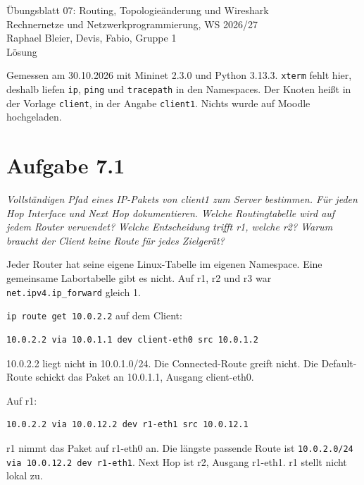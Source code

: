 \documentclass[a4paper,11pt]{article}
\newif\ifexplain
\newcommand{\aufgabe}[1]{\section*{Aufgabe #1}}
\newcommand{\angabe}[1]{{\raggedright\textit{#1}\par}\smallskip}
\newcommand{\explain}[1]{\ifexplain\begin{erklbox}#1\end{erklbox}\fi}
\begin{document}
\begin{center}
{\Large Übungsblatt 07: Routing, Topologieänderung und Wireshark}\\
Rechnernetze und Netzwerkprogrammierung, WS 2026/27\\
Raphael Bleier, Devis, Fabio, Gruppe 1\\
\ifexplain Erklärung\else Lösung\fi
\end{center}
Gemessen am 30.10.2026 mit Mininet 2.3.0 und Python 3.13.3. \texttt{xterm} fehlt hier, deshalb liefen \texttt{ip}, \texttt{ping} und \texttt{tracepath} in den Namespaces. Der Knoten heißt in der Vorlage \texttt{client}, in der Angabe \texttt{client1}. Nichts wurde auf Moodle hochgeladen.

\explain{Die Vorlage setzt Adressen in \texttt{start\_lab.py}, nicht in \texttt{topology.py}. r3 kommt in der Vorlage nicht vor. Die neuen Adressen stehen deshalb in der \texttt{start\_lab.py} dieses Ordners. Die Zahlen unten sind der Lauf vom 30.10.2026, nicht gerundet aus dem Bauch.}

\aufgabe{7.1}
\angabe{Vollständigen Pfad eines IP-Pakets von client1 zum Server bestimmen. Für jeden Hop Interface und Next Hop dokumentieren. Welche Routingtabelle wird auf jedem Router verwendet? Welche Entscheidung trifft r1, welche r2? Warum braucht der Client keine Route für jedes Zielgerät?}

Jeder Router hat seine eigene Linux-Tabelle im eigenen Namespace. Eine gemeinsame Labortabelle gibt es nicht. Auf r1, r2 und r3 war \texttt{net.ipv4.ip\_forward} gleich 1.

\texttt{ip route get 10.0.2.2} auf dem Client:
\begin{lstlisting}
10.0.2.2 via 10.0.1.1 dev client-eth0 src 10.0.1.2
\end{lstlisting}
10.0.2.2 liegt nicht in 10.0.1.0/24. Die Connected-Route greift nicht. Die Default-Route schickt das Paket an 10.0.1.1, Ausgang client-eth0.

\explain{Eine Default-Route ist die Sammelroute für alles, was keine längere passende Route hat. Der Client muss die Serveradresse nicht kennen. Er muss nur wissen, dass sie nicht lokal ist. Deshalb reicht ein Eintrag für alle fremden Ziele.}

Auf r1:
\begin{lstlisting}
10.0.2.2 via 10.0.12.2 dev r1-eth1 src 10.0.12.1
\end{lstlisting}
r1 nimmt das Paket auf r1-eth0 an. Die längste passende Route ist \texttt{10.0.2.0/24 via 10.0.12.2 dev r1-eth1}. Next Hop ist r2, Ausgang r1-eth1. r1 stellt nicht lokal zu.
\end{document}
